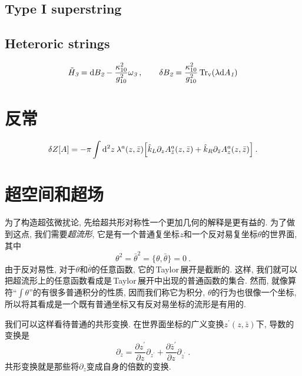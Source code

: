\subsection*{Type I superstring}

\subsection*{Heteroric strings}

\begin{equation}
    \tilde{H}_{\textit{3}}=\mathrm{d} B_{\textit{2}} - \frac{\kappa_{10}^{2}}{g_{10}^{2}}\omega_{\textit{3}}  \:, \qquad
        \delta B_{\textit{2}} = \frac{\kappa_{10}^{2}}{g_{10}^{2}}\operatorname{Tr}_{\mathrm{v}}(\lambda\mathrm{d} A_{\textit{1}})\label{12.1.40}
\end{equation}


\section{反常}

\begin{equation}
    \delta Z[A] = -\pi \int \mathrm{d}^{2}z\:\lambda^{a}(z,\bar{z})
    \Bigl[\hat{k}_{L}\partial_{z}A_{\bar{z}}^{a}(z,\bar{z})+\hat{k}_{R}\partial_{\bar{z}}A_{z}^{a}(z,\bar{z})\Bigr]\:.
    \label{12.2.3}
\end{equation}

\section{超空间和超场}

为了构造超弦微扰论, 先给超共形对称性一个更加几何的解释是更有益的. 为了做到这点, 我们需要{\emph{超流形}}, 它是有一个普通复坐标$ z $和一个反对易复坐标$ \theta $的世界面, 其中
\begin{equation}
    \theta^{2}=\bar{\theta}^{2} = \{\theta,\bar{\theta}\} = 0 \:. \label{12.3.1}
\end{equation}
由于反对易性, 对于$ \theta $和$ \bar{\theta} $的任意函数, 它的\,Taylor\,展开是截断的. 这样, 我们就可以把超流形上的任意函数看成是\,Taylor\,展开中出现的普通函数的集合. 然而, 就像算符``$\int\theta$''的有很多普通积分的性质, 因而我们称它为积分, $\theta $的行为也很像一个坐标, 所以将其看成是一个既有普通坐标又有反对易坐标的流形是有用的.

我们可以这样看待普通的共形变换. 在世界面坐标的广义变换$ z^{\prime}(z,\bar{z}) $下, 导数的变换是
\begin{equation}
    \partial_{z} = \frac{\partial z^{\prime}}{\partial z} \partial_{z^{\prime}}
    +\frac{\partial \bar{z}^{\prime}}{\partial z} \partial_{\bar{z}^{\prime}} \:.\label{12.3.2}
\end{equation}
共形变换就是那些将$ \partial_{z} $变成自身的倍数的变换.


